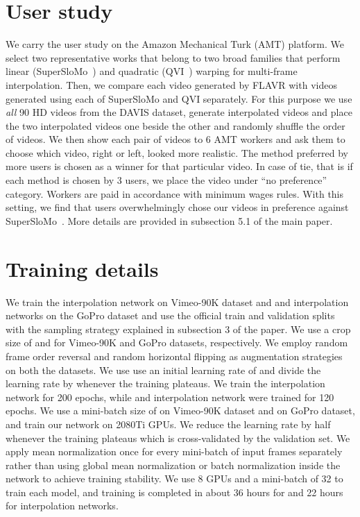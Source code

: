 \documentclass[10pt,twocolumn,letterpaper]{article}
\newcommand{\Ours}{FLAVR}
\newcommand{\twox}{}
\newcommand{\fourx}{}
\newcommand{\eightx}{}
\begin{document}
\begin{table*}[!t]
\section{User study}
\label{appendix:user_study}


We carry the user study on the Amazon Mechanical Turk (AMT) platform. We select two representative works that belong to two broad families that perform linear (SuperSloMo~\cite{jiang2018super}) and quadratic (QVI~\cite{xu2019quadratic}) warping for multi-frame interpolation. Then, we compare each video generated by \Ours{} with videos generated using each of SuperSloMo and QVI separately. For this purpose we use \emph{all} 90 HD videos from the DAVIS dataset, generate \eightx{} interpolated videos and place the two interpolated videos one beside the other and randomly shuffle the order of videos. We then show each pair of videos to 6 AMT workers and ask them to choose which video, right or left, looked more realistic. The method preferred by more users is chosen as a winner for that particular video. In case of tie, that is if each method is chosen by 3 users, we place the video under ``no preference'' category. Workers are paid in accordance with minimum wages rules. With this setting, we find that users overwhelmingly chose our videos in preference against SuperSloMo~\cite{jiang2018super}. More details are provided in subsection 5.1 of the main paper.






\section{Training details}
\label{appendix:training_details}

We train the \twox{} interpolation network on Vimeo-90K dataset and \fourx{} and \eightx{} interpolation networks on the GoPro dataset and use the official train and validation splits with the sampling strategy explained in subsection 3 of the paper. We use a crop size of  and  for Vimeo-90K and GoPro datasets, respectively. We employ random frame order reversal and random horizontal flipping as augmentation strategies on both the datasets. We use use an initial learning rate of  and divide the learning rate by  whenever the training plateaus. We train the \twox{} interpolation network for 200 epochs, while \fourx{} and \eightx{} interpolation network were trained for 120 epochs. We use a mini-batch size of  on Vimeo-90K dataset and  on GoPro dataset, and train our network on  2080Ti GPUs. We reduce the learning rate by half whenever the training plateaus which is cross-validated by the validation set. We apply mean normalization once for every mini-batch of input frames separately rather than using global mean normalization or batch normalization inside the network to achieve training stability. We use 8 GPUs and a mini-batch of 32 to train each model, and training is completed in about 36 hours for \twox{} and 22 hours for \eightx{} interpolation networks. 



\end{table*}
\end{document}
